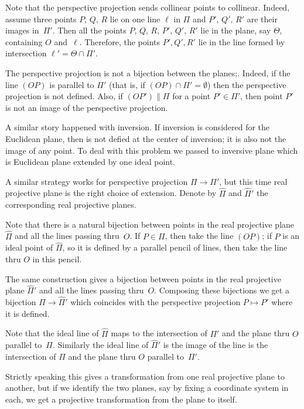Note that the perspective projection sends collinear points to collinear.
Indeed, assume three points $P$, $Q$, $R$ lie on one line $\ell$ in $\Pi$
and $P'$, $Q'$, $R'$ are their images in~$\Pi'$.
Then all the points $P$, $Q$, $R$, $P'$, $Q'$, $R'$ lie in the plane, say $\Theta$, containing $O$ and~$\ell$.
Therefore, the points $P',Q',R'$ lie in the line formed by intersection $\ell'=\Theta\cap \Pi'$.

The perspective projection is not a bijection between the planes;.
Indeed, if the line $(OP)$ is parallel to $\Pi'$ 
(that is, if $(OP)\cap\Pi'=\emptyset$)
then the perspective projection is not defined.
Also, if  $(OP')\parallel \Pi$ 
for a point $P'\in \Pi'$,
then point $P'$ is not an image of the perspective projection.

A similar story happened with inversion.
If inversion is considered for the Euclidean plane,
then is not defied at the center of inversion;
it is also not the image of any point.
To deal with this problem we passed to inversive plane 
which is Euclidean plane extended by one ideal point.

A similar strategy works for perspective projection $\Pi\to\Pi'$, but this time real projective plane is the right choice of extension.
Denote by $\hat \Pi$ and $\hat \Pi'$ 
the corresponding real projective planes.

Note that there is a natural bijection between points in the real projective plane $\hat \Pi$ and all the lines passing thru~$O$.
If $P\in \Pi$, then take the line $(OP)$;
if $P$ is an ideal point of $\hat \Pi$, so it is defined by a parallel pencil of lines, then take the line thru $O$  in this pencil. 

The same construction gives a bijection between points in the real projective plane $\hat \Pi'$ and all the lines passing thru~$O$.
Composing these bijections we get a bijection $\hat \Pi\to \hat \Pi'$ which coincides with the perspective projection $P\mapsto P'$
where it is defined.

Note that the ideal line of $\hat\Pi$ maps to the intersection of $\Pi'$ and the plane thru $O$ parallel to~$\Pi$.
Similarly the ideal line of $\hat\Pi'$
is the image of the line is the intersection of $\Pi$ and the plane thru $O$ parallel to~$\Pi'$.

Strictly speaking this gives a transformation from one real projective plane to another, 
but if we identify the two planes, say by fixing a coordinate system in each, 
we get a projective transformation from the plane to itself. 

